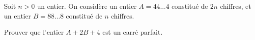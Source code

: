 Soit $n > 0$ un entier. On considère un entier $A = 44\dots 4$ constitué de $2n$ chiffres, et un entier $B=88\dots 8$ constitué de $n$ chiffres.

Prouver que l’entier $A + 2B + 4$ est un carré parfait.
